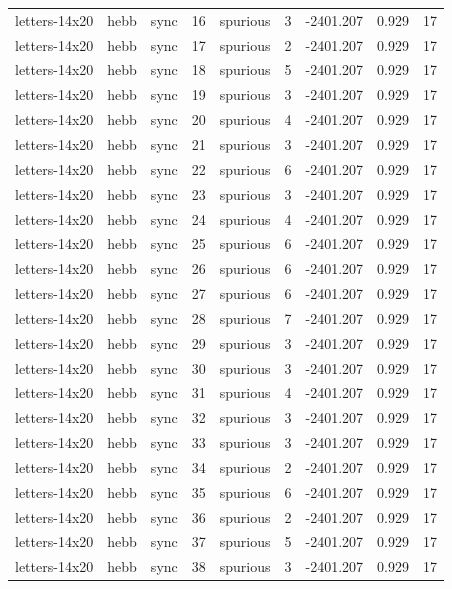\begin{tabular}{lllrlrrrr}
letters-14x20 & hebb & sync & 16 & spurious & 3 & -2401.207 & 0.929 & 17 \\
letters-14x20 & hebb & sync & 17 & spurious & 2 & -2401.207 & 0.929 & 17 \\
letters-14x20 & hebb & sync & 18 & spurious & 5 & -2401.207 & 0.929 & 17 \\
letters-14x20 & hebb & sync & 19 & spurious & 3 & -2401.207 & 0.929 & 17 \\
letters-14x20 & hebb & sync & 20 & spurious & 4 & -2401.207 & 0.929 & 17 \\
letters-14x20 & hebb & sync & 21 & spurious & 3 & -2401.207 & 0.929 & 17 \\
letters-14x20 & hebb & sync & 22 & spurious & 6 & -2401.207 & 0.929 & 17 \\
letters-14x20 & hebb & sync & 23 & spurious & 3 & -2401.207 & 0.929 & 17 \\
letters-14x20 & hebb & sync & 24 & spurious & 4 & -2401.207 & 0.929 & 17 \\
letters-14x20 & hebb & sync & 25 & spurious & 6 & -2401.207 & 0.929 & 17 \\
letters-14x20 & hebb & sync & 26 & spurious & 6 & -2401.207 & 0.929 & 17 \\
letters-14x20 & hebb & sync & 27 & spurious & 6 & -2401.207 & 0.929 & 17 \\
letters-14x20 & hebb & sync & 28 & spurious & 7 & -2401.207 & 0.929 & 17 \\
letters-14x20 & hebb & sync & 29 & spurious & 3 & -2401.207 & 0.929 & 17 \\
letters-14x20 & hebb & sync & 30 & spurious & 3 & -2401.207 & 0.929 & 17 \\
letters-14x20 & hebb & sync & 31 & spurious & 4 & -2401.207 & 0.929 & 17 \\
letters-14x20 & hebb & sync & 32 & spurious & 3 & -2401.207 & 0.929 & 17 \\
letters-14x20 & hebb & sync & 33 & spurious & 3 & -2401.207 & 0.929 & 17 \\
letters-14x20 & hebb & sync & 34 & spurious & 2 & -2401.207 & 0.929 & 17 \\
letters-14x20 & hebb & sync & 35 & spurious & 6 & -2401.207 & 0.929 & 17 \\
letters-14x20 & hebb & sync & 36 & spurious & 2 & -2401.207 & 0.929 & 17 \\
letters-14x20 & hebb & sync & 37 & spurious & 5 & -2401.207 & 0.929 & 17 \\
letters-14x20 & hebb & sync & 38 & spurious & 3 & -2401.207 & 0.929 & 17 \\

\end{tabular}
